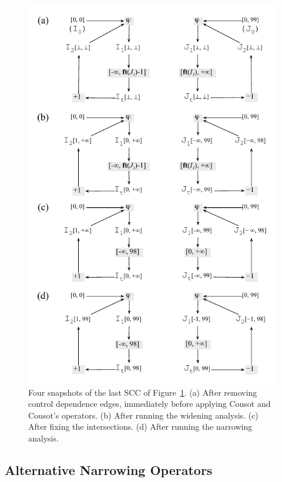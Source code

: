 \documentclass[preprint]{sigplanconf}
\begin{document}
\begin{figure}[t!]
\begin{center}
\includegraphics[width=\columnwidth]{images/ex_partition_grow_crop}
\end{center}
\caption{\label{fig:ex_partition_grow_crop}
Four snapshots of the last SCC of Figure~\ref{fig:ex_partition_grow_crop}.
(a) After removing control dependence edges, immediately before applying
Cousot and Cousot's operators.
(b) After running the widening analysis.
(c) After fixing the intersections.
(d) After running the narrowing analysis.}
\end{figure}

\subsection{Alternative Narrowing Operators}
\label{sub:alt}
\end{document}
